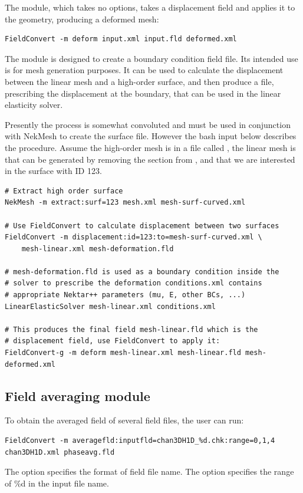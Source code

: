The  module, which takes no options, takes a displacement field
and applies it to the geometry, producing a deformed mesh:
\begin{lstlisting}[style=BashInputStyle]
FieldConvert -m deform input.xml input.fld deformed.xml
\end{lstlisting}

The  module is designed to create a boundary condition field
file. Its intended use is for mesh generation purposes. It can be used to
calculate the displacement between the linear mesh and a high-order surface, and
then produce a  file, prescribing the displacement at the boundary,
that can be used in the linear elasticity solver.

Presently the process is somewhat convoluted and must be used in conjunction
with NekMesh to create the surface file. However the bash input below
describes the procedure. Assume the high-order mesh is in a file called
, the linear mesh is  that can be
generated by removing the  section from , and that
we are interested in the surface with ID 123.

\begin{lstlisting}[style=BashInputStyle]
# Extract high order surface
NekMesh -m extract:surf=123 mesh.xml mesh-surf-curved.xml

# Use FieldConvert to calculate displacement between two surfaces
FieldConvert -m displacement:id=123:to=mesh-surf-curved.xml \
    mesh-linear.xml mesh-deformation.fld

# mesh-deformation.fld is used as a boundary condition inside the
# solver to prescribe the deformation conditions.xml contains
# appropriate Nektar++ parameters (mu, E, other BCs, ...)
LinearElasticSolver mesh-linear.xml conditions.xml

# This produces the final field mesh-linear.fld which is the
# displacement field, use FieldConvert to apply it:
FieldConvert-g -m deform mesh-linear.xml mesh-linear.fld mesh-deformed.xml
\end{lstlisting}

\subsection{Field averaging module}
To obtain the averaged field of several field files, the user can run:
\begin{lstlisting}[style=BashInputStyle]
FieldConvert -m averagefld:inputfld=chan3DH1D_%d.chk:range=0,1,4 chan3DH1D.xml phaseavg.fld
\end{lstlisting}
The option  specifies the format of field file name. The option  specifies the range of \%d in the input file name.

